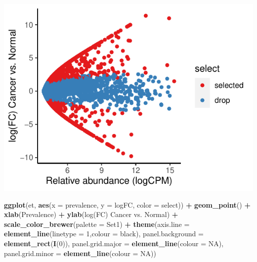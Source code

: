 \documentclass[
]{article}
\newenvironment{Shaded}{\begin{snugshade}}{\end{snugshade}}
\newcommand{\AttributeTok}[1]{\textcolor[rgb]{0.13,0.29,0.53}{#1}}
\newcommand{\ConstantTok}[1]{\textcolor[rgb]{0.56,0.35,0.01}{#1}}
\newcommand{\DecValTok}[1]{\textcolor[rgb]{0.00,0.00,0.81}{#1}}
\newcommand{\FunctionTok}[1]{\textcolor[rgb]{0.13,0.29,0.53}{\textbf{#1}}}
\newcommand{\NormalTok}[1]{#1}
\newcommand{\SpecialCharTok}[1]{\textcolor[rgb]{0.81,0.36,0.00}{\textbf{#1}}}
\newcommand{\StringTok}[1]{\textcolor[rgb]{0.31,0.60,0.02}{#1}}
\begin{document}
\includegraphics{workshop_files/figure-latex/unnamed-chunk-52-2.pdf}

\begin{Shaded}
\begin{Highlighting}[]

\FunctionTok{ggplot}\NormalTok{(et, }\FunctionTok{aes}\NormalTok{(}\AttributeTok{x =}\NormalTok{ prevalence, }\AttributeTok{y =}\NormalTok{ logFC, }\AttributeTok{color =}\NormalTok{ select)) }\SpecialCharTok{+} \FunctionTok{geom\_point}\NormalTok{() }\SpecialCharTok{+}
  \FunctionTok{xlab}\NormalTok{(}\StringTok{\textquotesingle{}Prevalence\textquotesingle{}}\NormalTok{) }\SpecialCharTok{+} \FunctionTok{ylab}\NormalTok{(}\StringTok{\textquotesingle{}log(FC) Cancer vs. Normal\textquotesingle{}}\NormalTok{) }\SpecialCharTok{+} 
  \FunctionTok{scale\_color\_brewer}\NormalTok{(}\AttributeTok{palette =} \StringTok{\textquotesingle{}Set1\textquotesingle{}}\NormalTok{) }\SpecialCharTok{+}
  \FunctionTok{theme}\NormalTok{(}\AttributeTok{axis.line =} \FunctionTok{element\_line}\NormalTok{(}\AttributeTok{linetype =} \DecValTok{1}\NormalTok{,}\AttributeTok{colour =} \StringTok{\textquotesingle{}black\textquotesingle{}}\NormalTok{),}
        \AttributeTok{panel.background =} \FunctionTok{element\_rect}\NormalTok{(}\FunctionTok{I}\NormalTok{(}\DecValTok{0}\NormalTok{)),}
        \AttributeTok{panel.grid.major =} \FunctionTok{element\_line}\NormalTok{(}\AttributeTok{colour =} \ConstantTok{NA}\NormalTok{),}
        \AttributeTok{panel.grid.minor =} \FunctionTok{element\_line}\NormalTok{(}\AttributeTok{colour =} \ConstantTok{NA}\NormalTok{))}
\end{Highlighting}
\end{Shaded}
\end{document}
